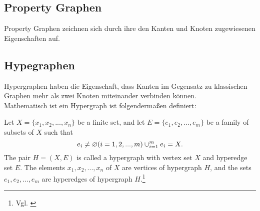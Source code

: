 \subsection{Property Graphen}
Property Graphen zeichnen sich durch ihre den Kanten und Knoten zugewiesenen Eigenschaften auf.
\subsection{Hypegraphen}
Hypergraphen haben die Eigenschaft, dass Kanten im Gegensatz zu klassischen Graphen mehr als zwei Knoten miteinander verbinden können.
\\Mathematisch ist ein Hypergraph ist folgendermaßen definiert:
\begin{definition}
	Let $X=\{x_{1}, x_{2},...,x_{n}\}$ be a finite set,
	and let $E=\{e_{1},e_{2},...,e_{m}\}$ be a family of subsets of $X$ such that
	\[e_{i} \neq \varnothing (i=1,2,...,m) \\
	\cup_{i=1}^{m}e_{i}=X.
	\]
	The pair $H=(X,E)$ is called a hypergraph with vertex set $X$
	and hyperedge set $E$. The elements $x_{1}, x_{2},...,x_{n}$ of $X$ are vertices
	of hypergraph $H$, and the sets $e_{1}, e_{2},...,e_{m}$ are hyperedges of hypergraph $H$.\footnote{Vgl. \cite[Seite 2]{zhang2018hypergraph}}
\end{definition}
